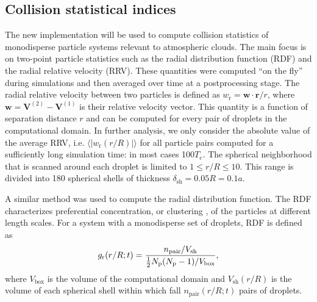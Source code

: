 \documentclass[../thesis.tex]{subfiles}
\begin{document}
\subsection{Collision statistical indices}
The new implementation will be used to compute collision statistics of monodisperse particle systems relevant to atmospheric clouds. The main focus is on two-point particle statistics such as the radial distribution function (RDF) and the radial relative velocity (RRV). These quantities were computed ``on the fly'' during simulations and then averaged over time at a postprocessing stage. The radial relative velocity between two particles is defined as $w_\text{r}=\boldsymbol{w\cdot r}/r$, where $\boldsymbol{w}=\boldsymbol{V}^{(2)}-\boldsymbol{V}^{(1)}$ is their relative velocity vector. This quantity is a function of separation distance $r$ and can be computed for every pair of droplets in the computational domain. In further analysis, we only consider the absolute value of the average RRV, i.e. $\langle|w_\text{r} (r/R)|\rangle$ for all particle pairs computed for a sufficiently long simulation time: in most cases 100$T_e$. The spherical neighborhood that is scanned around each droplet is limited to $1\leq r/R\leq10$. This range is divided into 180 spherical shells of thickness $\delta_\text{sh}=0.05R=0.1a$.

A similar method was used to compute the radial distribution function. The RDF characterizes preferential concentration, or clustering \citep{BIC15}, of the particles at different length scales. For a system with a monodisperse set of droplets, RDF is defined as
\begin{equation}
g_\text{r} (r/R; t)=\frac{n_\text{pair}/V_\text{sh}}{\frac{1}{2}N_{\text p}(N_{\text p}-1)/V_\text{box}},
\end{equation}
where $V_\text{box}$ is the volume of the computational domain and $V_\text{sh}(r/R)$ is the volume of each spherical shell within which fall $n_\text{pair}(r/R; t)$ pairs of droplets.
\end{document}
